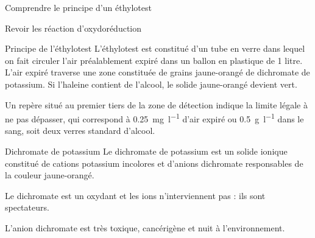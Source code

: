 \teteTermStssRout
{}

\begin{objectifs}
  \item Comprendre le principe d'un éthylotest
  \item Revoir les réaction d'oxydoréduction
\end{objectifs}


\begin{doc}{Principe de l'éthylotest}
  L'éthylotest est constitué d'un tube en verre dans lequel on fait circuler l'air préalablement expiré dans un ballon en plastique de 1 litre.  
  L'air expiré traverse une zone constituée de grains jaune-orangé de dichromate de potassium.
  Si l'haleine contient de l'alcool, le solide jaune-orangé devient vert.

  Un repère situé au premier tiers de la zone de détection indique la limite légale à ne pas dépasser, qui correspond à \qty{0,25}{\milli\g\per\litre} d’air expiré ou \qty{0.5}{\g\per\litre} dans le sang, soit deux verres standard d'alcool.

  \begin{center}
  \end{center}
\end{doc}

\begin{doc}{Dichromate de potassium}
  Le dichromate de potassium  est un solide ionique constitué de cations potassium \ionPotassium incolores et d'anions dichromate responsables de la couleur jaune-orangé.
  
  Le dichromate est un oxydant et les ions \ionPotassium n'interviennent pas : ils sont spectateurs.

  L'anion dichromate est très toxique, cancérigène et nuit à l'environnement.
  \begin{center}
  \end{center}
\end{doc}

